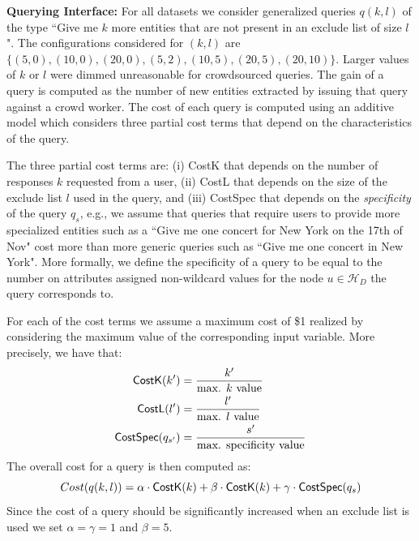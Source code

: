 \documentclass{vldb}
\newcommand{\hierarchy}{\mathcal{H}_D}
\begin{document}
\vspace{5pt}\noindent\textbf{Querying Interface:} For all datasets we consider generalized queries $q(k,l)$ of the type ``Give me $k$ more entities that are not present in an exclude list of size $l$". The  configurations considered for $(k,l)$ are $\{(5,0), (10,0), (20,0), (5,2), (10,5), (20,5), (20,10)\}$. Larger values of $k$ or $l$ were dimmed unreasonable for crowdsourced queries. The gain of a query is computed as the number of new entities extracted by issuing that query against a crowd worker.  The cost of each query is computed using an additive model which considers three partial cost terms that depend on the characteristics of the query. 

The three partial cost terms are: (i) {\sf CostK} that depends on the number of responses $k$ requested from a user, (ii) {\sf CostL} that depends on the size of the exclude list $l$ used in the query, and (iii) {\sf CostSpec} that depends on the {\em specificity} of the query $q_s$, e.g., we assume that queries that require users to provide more specialized entities such as a ``Give me one concert for New York on the 17th of Nov" cost more than more generic queries such as ``Give me one concert in New York". More formally, we define the specificity of a query to be equal to the number on attributes assigned non-wildcard values for the node $u \in \hierarchy$ the query corresponds to. 

For each of the cost terms we assume a maximum cost of \$1 realized by considering the maximum value of the corresponding input variable. More precisely, we have that:
\begin{align}
{\sf CostK}(k^{\prime}) &= \frac{k^{\prime}}{\mbox{max. $k$ value}} \nonumber \\
{\sf CostL}(l^{\prime}) &= \frac{l^{\prime}}{\mbox{max. $l$ value}} \nonumber \\
{\sf CostSpec}(q_{s^{\prime}}) &= \frac{s^{\prime}}{\mbox{max. specificity value}} \nonumber
\end{align}
The overall cost for a query is then computed as:
\begin{equation}
Cost(q(k,l)) = \alpha \cdot {\sf CostK}(k) + \beta \cdot  {\sf CostK}(k) + \gamma \cdot  {\sf CostSpec}(q_s) \nonumber
\end{equation}
Since the cost of a query should be significantly increased when an exclude list is used we set $\alpha = \gamma = 1$ and $\beta = 5$. 
\end{document}
